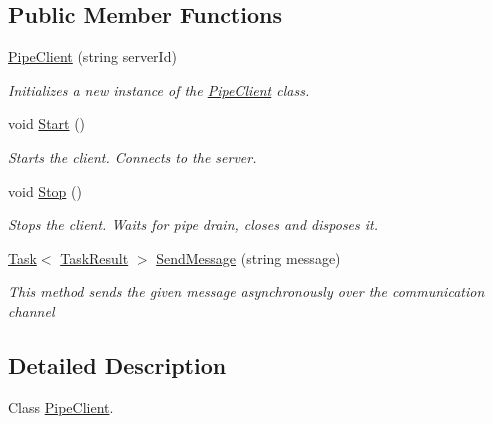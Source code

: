 \subsection*{Public Member Functions}
\begin{DoxyCompactItemize}
\item 
\hyperlink{class_client_server_using_named_pipes_1_1_client_1_1_pipe_client_aa1a9a481e206f60bbc8bf288f33b2622}{Pipe\+Client} (string server\+Id)
\begin{DoxyCompactList}\small\item\em Initializes a new instance of the \hyperlink{class_client_server_using_named_pipes_1_1_client_1_1_pipe_client}{Pipe\+Client} class. \end{DoxyCompactList}\item 
void \hyperlink{class_client_server_using_named_pipes_1_1_client_1_1_pipe_client_a0bb2855199630657cdf070e3c4275b51}{Start} ()
\begin{DoxyCompactList}\small\item\em Starts the client. Connects to the server. \end{DoxyCompactList}\item 
void \hyperlink{class_client_server_using_named_pipes_1_1_client_1_1_pipe_client_a9d442b0b2a19c3d460185a8bb27e36e9}{Stop} ()
\begin{DoxyCompactList}\small\item\em Stops the client. Waits for pipe drain, closes and disposes it. \end{DoxyCompactList}\item 
\hyperlink{class_system_1_1_threading_1_1_tasks_1_1_task}{Task}$<$ \hyperlink{class_client_server_using_named_pipes_1_1_utilities_1_1_task_result}{Task\+Result} $>$ \hyperlink{class_client_server_using_named_pipes_1_1_client_1_1_pipe_client_af1b876c52ee2cfc920dcf56ea7434839}{Send\+Message} (string message)
\begin{DoxyCompactList}\small\item\em This method sends the given message asynchronously over the communication channel \end{DoxyCompactList}\end{DoxyCompactItemize}


\subsection{Detailed Description}
Class \hyperlink{class_client_server_using_named_pipes_1_1_client_1_1_pipe_client}{Pipe\+Client}. 

